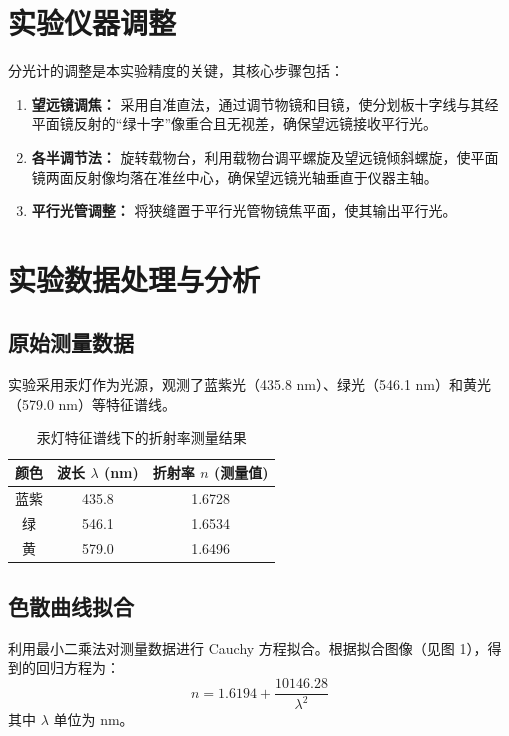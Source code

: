 \documentclass[10pt,twocolumn,a4paper]{article}
\begin{document}
	\section{实验仪器调整}
	分光计的调整是本实验精度的关键，其核心步骤包括：
	\begin{enumerate}
		\item \textbf{望远镜调焦：} 采用自准直法，通过调节物镜和目镜，使分划板十字线与其经平面镜反射的“绿十字”像重合且无视差，确保望远镜接收平行光。
		\item \textbf{各半调节法：} 旋转载物台，利用载物台调平螺旋及望远镜倾斜螺旋，使平面镜两面反射像均落在准丝中心，确保望远镜光轴垂直于仪器主轴。
		\item \textbf{平行光管调整：} 将狭缝置于平行光管物镜焦平面，使其输出平行光。
	\end{enumerate}
	
	\section{实验数据处理与分析}
	
	\subsection{原始测量数据}
	实验采用汞灯作为光源，观测了蓝紫光（435.8 nm）、绿光（546.1 nm）和黄光（579.0 nm）等特征谱线。
	
	\begin{table}[htbp]
		\centering
		\caption{汞灯特征谱线下的折射率测量结果}
		\begin{tabular}{ccc}
			\toprule
			颜色 & 波长 $\lambda$ (nm) & 折射率 $n$ (测量值) \\
			\midrule
			蓝紫 & 435.8 & 1.6728 \\
			绿 & 546.1 & 1.6534 \\
			黄 & 579.0 & 1.6496 \\
			\bottomrule
		\end{tabular}
	\end{table}
	
	\subsection{色散曲线拟合}
	利用最小二乘法对测量数据进行 Cauchy 方程拟合。根据拟合图像（见图 1），得到的回归方程为：
	\begin{equation}
		n = 1.6194 + \frac{10146.28}{\lambda^2}
	\end{equation}
	其中 $\lambda$ 单位为 nm。
	
\end{document}
